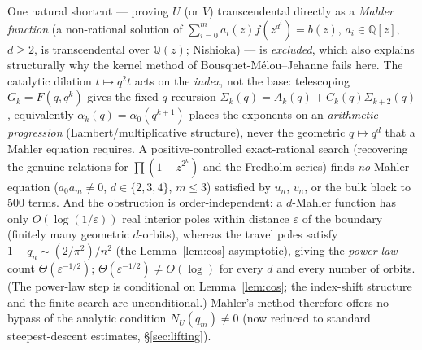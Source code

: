 \begin{remark}\label{rem:mahler}
One natural shortcut --- proving $U$ \textup(or $V$\textup) transcendental directly as a
\emph{Mahler function} \textup(a non-rational solution of $\sum_{i=0}^m a_i(z)f(z^{d^i})=b(z)$,
$a_i\in\mathbb Q[z]$, $d\ge2$, is transcendental over $\mathbb Q(z)$; Nishioka\textup) --- is
\emph{excluded}, which also explains structurally why the kernel method of Bousquet-M\'elou--Jehanne
fails here. The catalytic dilation $t\mapsto q^2t$ acts on the \emph{index}, not the base: telescoping
$G_k=F(q,q^k)$ gives the fixed-$q$ recursion $\Sigma_k(q)=A_k(q)+C_k(q)\Sigma_{k+2}(q)$, equivalently
$\alpha_k(q)=\alpha_0(q^{k+1})$ places the exponents on an \emph{arithmetic progression}
\textup(Lambert/multiplicative structure\textup), never the geometric $q\mapsto q^d$ that a Mahler
equation requires. A positive-controlled exact-rational search \textup(recovering the genuine relations
for $\prod(1-z^{2^k})$ and the Fredholm series\textup) finds \emph{no} Mahler equation
\textup($a_0a_m\ne0$, $d\in\{2,3,4\}$, $m\le3$\textup) satisfied by $u_n$, $v_n$, or the bulk block to
$500$ terms. And the obstruction is order-independent: a $d$-Mahler function has only $O(\log(1/\varepsilon))$
real interior poles within distance $\varepsilon$ of the boundary \textup(finitely many geometric
$d$-orbits\textup), whereas the travel poles satisfy $1-q_n\sim(2/\pi^2)/n^2$ \textup(the
Lemma~\ref{lem:cos} asymptotic\textup), giving the \emph{power-law} count $\Theta(\varepsilon^{-1/2})$;
$\Theta(\varepsilon^{-1/2})\ne O(\log)$ for every $d$ and every number of orbits. \textup(The
power-law step is conditional on Lemma~\ref{lem:cos}; the index-shift structure and the finite search are
unconditional.\textup) Mahler's method therefore offers no bypass of the analytic condition $N_U(q_m)\ne0$ (now reduced to
standard steepest-descent estimates, \S\ref{sec:lifting}).
\end{remark}

%
